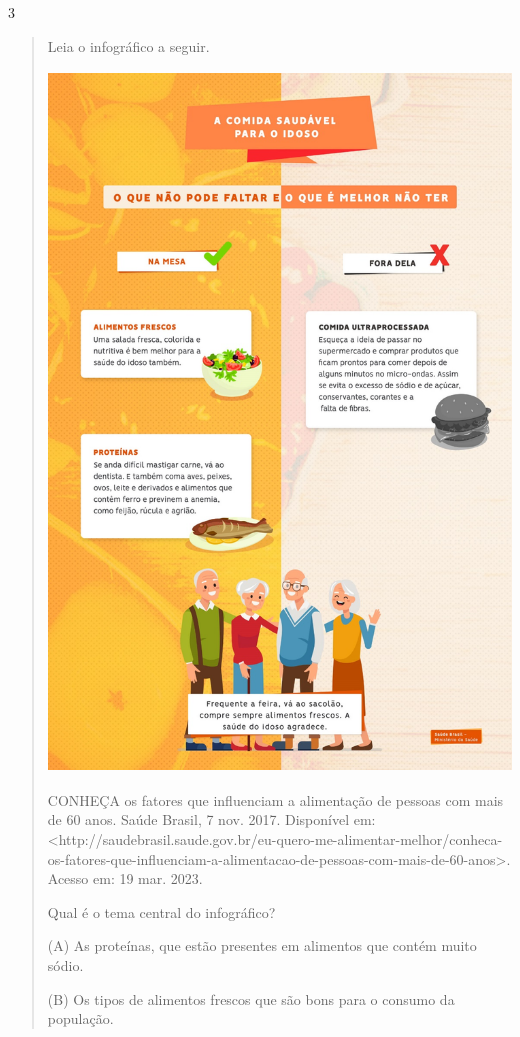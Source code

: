 \begin{escolha}
\num{3}

\begin{quote}
Leia o infográfico a seguir.

\includegraphics[width=4.87500in,height=7.31250in]{media/image38.jpeg}

CONHEÇA os fatores que influenciam a alimentação de pessoas com mais de
60 anos. Saúde Brasil, 7 nov. 2017. Disponível em:
\textless{}http://saudebrasil.saude.gov.br/eu-quero-me-alimentar-melhor/conheca-os-fatores-que-influenciam-a-alimentacao-de-pessoas-com-mais-de-60-anos\textgreater{}.
Acesso em: 19 mar. 2023.

Qual é o tema central do infográfico?

(A) As proteínas, que estão presentes em alimentos que contém muito
sódio.

(B) Os tipos de alimentos frescos que são bons para o consumo da
população.


\end{quote}
\end{escolha}

